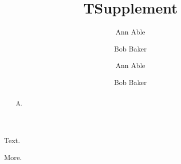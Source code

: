 \documentclass[aps,prl]{revtex4-2}
\begin{document}
\title{T}
\author{Ann Able}
\author{Bob Baker}
\begin{abstract}
A.
\end{abstract}
\maketitle
Text.
\clearpage
\title{Supplement}
\author{Ann Able}
\author{Bob Baker}
\maketitle
More.
\end{document}
